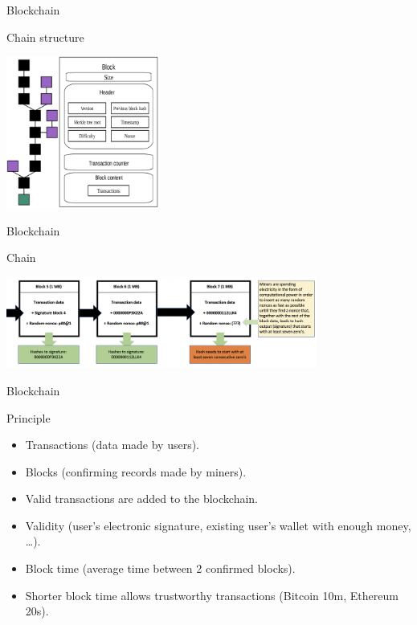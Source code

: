 \begin{frame}{Blockchain}
  \begin{block}{Chain structure}
    \begin{center}
      \includegraphics[height=5cm]{img/blockchain.png}
    \end{center}
  \end{block}
\end{frame}

\begin{frame}{Blockchain}
  \begin{block}{Chain}
    \begin{center}
      \includegraphics[height=3cm]{img/blocks.png}
    \end{center}
  \end{block}
\end{frame}

\begin{frame}{Blockchain}
  \begin{block}{Principle}
    \begin{itemize}
      \item Transactions (data made by users).
      \item Blocks (confirming records made by miners).
      \item Valid transactions are added to the blockchain.
      \item Validity (user's electronic signature, existing user's wallet with enough money, \dots).
      \item Block time (average time between 2 confirmed blocks).
      \item Shorter block time allows trustworthy transactions (Bitcoin 10m, Ethereum 20s).
    \end{itemize}
  \end{block}
\end{frame}

